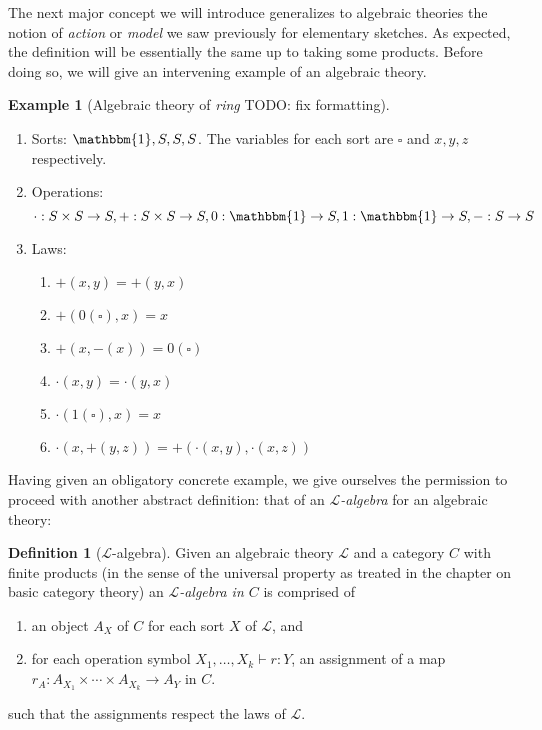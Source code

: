 \documentclass[12pt,twoside]{reedthesis}
\theoremstyle{definition}
\newtheorem{definition}{Definition}
\newtheorem{example}{Example}
\theoremstyle{remark}
\theoremstyle{theorem}
\begin{document}
The next major concept we will introduce generalizes to algebraic theories the
notion of \emph{action} or \emph{model} we saw previously for elementary
sketches. As expected, the definition will be essentially the same up to taking
some products. Before doing so, we will give an intervening example of an
algebraic theory.
\begin{example}[Algebraic theory of \emph{ring} TODO: fix formatting]
  \begin{enumerate}
    \item Sorts: \( \mathbbm{1}, S, S, S \). The variables for each sort are
          \( \square \) and \( x, y, z\) respectively.

    \item Operations: \[
      \cdot : S \times S \rightarrow S,
      + : S \times S \rightarrow S,
      0 : \mathbbm{1} \rightarrow S,
      1 : \mathbbm{1} \rightarrow S,
      - : S \rightarrow S\]

        \item Laws: \begin{enumerate}
          \item \( +(x,y) = +(y,x) \)
          \item \( +(0(\square), x) = x \)
          \item \( +(x, -(x)) = 0(\square) \)

          \item \( \cdot(x,y) = \cdot(y,x) \)
          \item \( \cdot(1(\square), x) = x \)

          \item \( \cdot(x, +(y,z)) = +(\cdot(x,y), \cdot(x,z))\)
    \end{enumerate}
  \end{enumerate}
\end{example}

Having given an obligatory concrete example, we give ourselves the permission to
proceed with another abstract definition: that of an
\emph{$\mathcal{L}$-algebra} for an algebraic theory:

\begin{definition}[$\mathcal{L}$-algebra]
  Given an algebraic theory $\mathcal{L}$ and a category $C$ with finite
  products (in the sense of the universal property as treated in the chapter on
  basic category theory) an \emph{$\mathcal{L}$-algebra in $C$} is comprised of
  \begin{enumerate}
    \item an object $A_{X}$ of $C$ for each sort $X$ of $\mathcal{L}$, and
    \item for each operation symbol $X_{1}, \dots , X_{k} \vdash r : Y$, an
          assignment of a map $r_{A} : A_{X_{1}} \times \cdots \times A_{X_{k}} \rightarrow A_{Y}$ in
          $C$.
  \end{enumerate}
  such that the assignments respect the laws of $\mathcal{L}$.
\end{definition}
\end{document}
